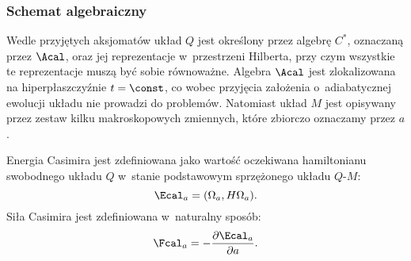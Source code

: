 \documentclass[10pt,t]{beamer}
\begin{document}
\begin{frame}
  \frametitle{Schemat algebraiczny}


  Wedle przyjętych aksjomatów układ $Q$ jest określony przez algebrę
  $C^{ * }$, oznaczaną przez $\Acal$, oraz jej reprezentacje w~przestrzeni
  Hilberta, przy czym wszystkie te reprezentacje muszą być sobie równoważne.
  Algebra $\Acal$ jest zlokalizowana na hiperpłaszczyźnie $t = \const$, co
  wobec przyjęcia założenia o~adiabatycznej ewolucji układu nie prowadzi
  do problemów. Natomiast układ $M$ jest opisywany przez zestaw kilku
  makroskopowych zmiennych, które zbiorczo oznaczamy przez $a$.

  Energia Casimira jest zdefiniowana jako wartość oczekiwana
  hamiltonianu \alert{swobodnego} układu $Q$ w~stanie podstawowym
  sprzężonego układu $Q\text{-}M$:
  \begin{equation}
    \label{eq:Algebraiczne-podejscie-ETC-01}
    \Ecal_{ a } = ( \Omega_{ a }, H \Omega_{ a } ).
  \end{equation}
  Siła Casimira jest zdefiniowana w~naturalny sposób:
  \begin{equation}
    \label{eq:Algebraiczne-podejscie-ETC-02}
    \Fcal_{ a } = -\frac{ \partial \Ecal_{ a } }{ \partial a }.
  \end{equation}

\end{frame}







\end{document}
